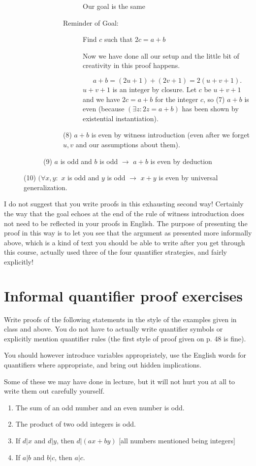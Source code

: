 \documentclass[12pt]{article}
\begin{document}
\begin{description}
\begin{description}
\begin{description}
\begin{description}
Our goal is the same

\item[Reminder of Goal:]  Find $c$ such that $2c=a+b$

Now we have done all our setup and the little bit of creativity in this proof happens.

$$a+b = (2u+1) + (2v+1) = 2(u+v+1).$$  $u+v+1$ is an integer by closure.  Let $c$ be $u+v+1$ and we have
$2c=a+b$ for the integer $c$, so (7) $a+b$ is even (because $(\exists z:2z=a+b)$ has been shown by existential instantiation).

\end{description}
(8) $a+b$ is even by witness introduction (even after we forget $u,v$ and our assumptions about them).
\end{description}
(9)  $a$ is odd and $b$ is odd $\rightarrow$  $a+b$ is even by deduction
\end{description}
(10) $(\forall x,y:$ $x$ is odd and $y$ is odd $\rightarrow$ $x+y$ is even by universal generalization.

\end{description}

I do not suggest that you write proofs in this exhausting second way!  Certainly the way that the goal echoes at the end of the rule of witness introduction does not need to be reflected in your proofs in English.  The purpose of presenting the proof in this way is to let you see that the argument as presented more informally above, which is a kind of text you should be able to write after you get through this course, actually used three of the four quantifier strategies, and fairly explicitly!

\section{Informal quantifier proof exercises}

Write proofs of the following statements in the style of the examples given in class and above.  You do not have to actually write quantifier symbols or explicitly mention quantifier rules (the first style of proof given on p. 48  is fine).

You should however introduce variables appropriately, use the English words for quantifiers where appropriate, and bring out hidden implications.

Some of these we may have done in lecture, but it will not hurt you at all to write them out carefully yourself.

\begin{enumerate}

\item  The sum of an odd number and an even number is odd.

\item  The product of two odd integers is odd.

\item  If $d|x$ and $d|y$, then $d|(ax + by)$ [all numbers mentioned being integers]

\item If $a|b$ and $b|c$, then $a|c$.


\end{enumerate}
\end{document}
